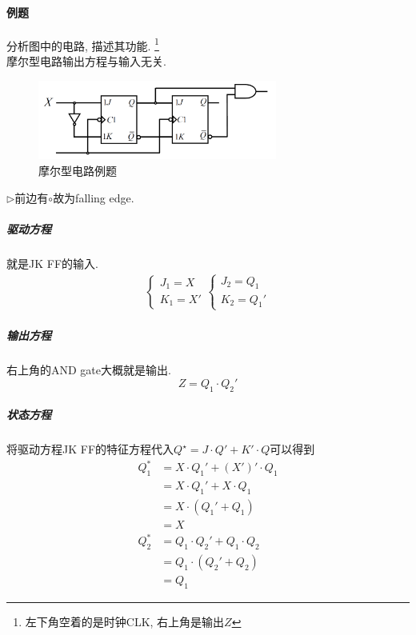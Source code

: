 \documentclass[scheme=chinese,a4paper]{report}
\begin{document}
\paragraph{例题}分析图中的电路, 描述其功能. \footnote{左下角空着的是时钟CLK, 右上角是输出$Z$}\\
摩尔型电路输出方程与输入无关. 
\begin{figure}[H]
\centering
\includegraphics[width=0.7\textwidth]{sync_example.png}
\caption{摩尔型电路例题}
\label{eg:sync_1}
\end{figure}
$\triangleright$前边有$\circ$故为falling edge. 
\subparagraph{驱动方程} 就是JK FF的输入. 
\begin{align*}
    \begin{cases}
        J_1=X\\
        K_1=X'
    \end{cases}
    \begin{cases}
        J_2=Q_1\\
        K_2=Q_1'
    \end{cases}
\end{align*}
\subparagraph{输出方程}右上角的AND gate大概就是输出. 
$$Z=Q_1\cdot Q_2'$$

\subparagraph{状态方程}将驱动方程JK FF的特征方程代入$Q^\star=J\cdot Q'+K'\cdot Q$可以得到
\begin{align*}
    Q^*_1&=X\cdot Q_1'+(X')'\cdot Q_1\\
    &=X\cdot Q_1'+X\cdot Q_1\\
    &=X\cdot(Q_1'+Q_1)\\
    &=X\\
    Q^*_2&=Q_1\cdot Q_2'+Q_1\cdot Q_2\\
    &=Q_1\cdot(Q_2'+Q_2)\\
    &=Q_1
\end{align*}
\end{document}

